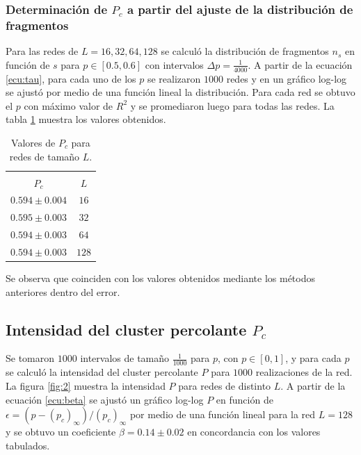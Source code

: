 \documentclass[%
 reprint,
 amsmath,amssymb,
 aps,
spanish]{revtex4-1}
\begin{document}
\subsubsection{\label{1d} Determinación de $P_c$ a partir del ajuste de la distribución de fragmentos}
Para las redes de $L={16, 32, 64, 128}$ se calculó la distribución de fragmentos $n_s$ en función de $s$ para $p\in[0.5, 0.6]$ con intervalos $\Delta p = \frac{1}{4000}$. A partir de la ecuación \ref{ecu:tau}, para cada uno de los $p$ se realizaron $1000$ redes y en un gráfico log-log se ajustó por medio de una función lineal la distribución. Para cada red se obtuvo el $p$ con máximo valor de $R^2$ y se promediaron luego para todas las redes.
La tabla \ref{tabla:tabla1d} muestra los valores obtenidos.

\begin{table}[h]
\caption{\label{tabla:tabla1d}Valores de $P_c$ para redes de tamaño $L$.}
	\begin{tabular}{c|c}
		\hline
		\hline		
		\\[-5pt]
		$P_c$ & $L$ \\
		\hline
		$0.594\pm0.004$ & $16$ \\
		$0.595\pm0.003$ & $32$ \\
		$0.594\pm0.003$ & $64$ \\
		$0.594\pm0.003$ & $128$ \\															
	\end{tabular}
\end{table}

Se observa que coinciden con los valores obtenidos mediante los métodos anteriores dentro del error.

\subsection{\label{2} Intensidad del cluster percolante $P_c$}
Se tomaron $1000$ intervalos de tamaño $\frac{1}{1000}$ para $p$, con $p \in [0, 1]$, y para cada $p$ se calculó la intensidad del cluster percolante $P$ para $1000$ realizaciones de la red. La figura \ref{fig:2} muestra la intensidad $P$ para redes de distinto $L$. A partir de la ecuación \ref{ecu:beta} se ajustó un gráfico log-log $P$ en función de $\epsilon = (p-(p_c)_{\infty})/(p_c)_{\infty}$ por medio de una función lineal para la red $L=128$ y se obtuvo un coeficiente $\beta=0.14\pm0.02$ en concordancia con los valores tabulados.
\end{document}
